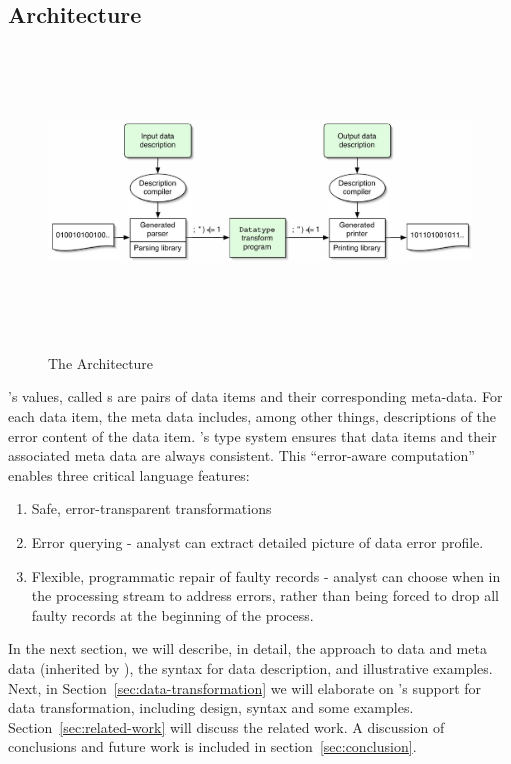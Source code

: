 \subsection{\datatype{} Architecture}

\begin{figure}[tp]
  \includegraphics[height=3in,width=5in]{architecture-grant}
\label{fig:pads-arch}
\caption{The \pads{} Architecture}
\end{figure}


\datatype{}'s values, called \emph{\pvalue}s are pairs of data items
and their corresponding meta-data.  For each data item, the meta data
includes, among other things, descriptions of the error content of the
data item.  \datatype{}'s type system ensures that data items and
their associated meta data are always consistent.  This ``error-aware
computation'' enables three critical language features:
\begin{enumerate}
\item Safe, error-transparent transformations
\item Error querying - analyst can extract detailed picture of data
  error profile.
\item Flexible, programmatic repair of faulty records - analyst can
  choose when in the processing stream to address errors, rather than
  being forced to drop all faulty records at the beginning of the process.
\end{enumerate}

In the next section, we will describe, in detail, the \pads{} approach
to data and meta data (inherited by \datatype{}), the \datatype{}
syntax for data description, and illustrative examples. Next, in
Section~\ref{sec:data-transformation} we will elaborate on
\datatype{}'s support for data transformation, including design,
syntax and some examples.  Section~\ref{sec:related-work} will discuss
the related work. A discussion of conclusions and future work is
included in section~\ref{sec:conclusion}.

